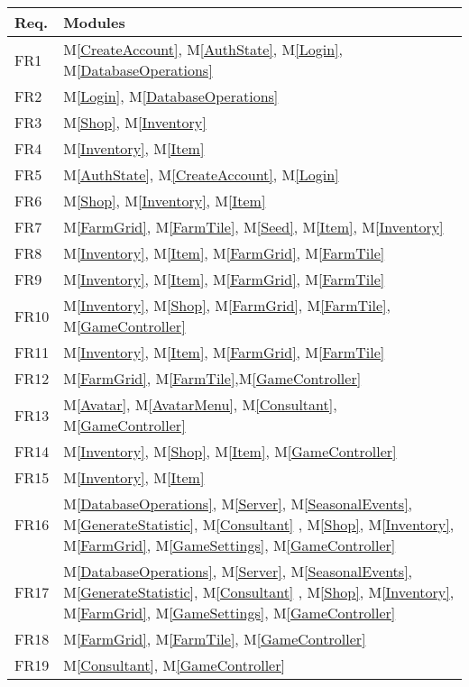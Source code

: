 \documentclass[12pt, titlepage]{article}
\newcommand{\mref}[1]{M\ref{#1}}
\begin{document}
\begin{table}[H]
\centering
\begin{tabular}{p{} p{}}
\toprule
\textbf{Req.} & \textbf{Modules}\\
\midrule
FR1 & \mref{CreateAccount}, \mref{AuthState}, \mref{Login}, \mref{DatabaseOperations}\\
FR2 &  \mref{Login}, \mref{DatabaseOperations}\\
FR3 & \mref{Shop}, \mref{Inventory} \\
FR4 & \mref{Inventory}, \mref{Item}\\
FR5 & \mref{AuthState}, \mref{CreateAccount}, \mref{Login}\\
FR6 & \mref{Shop}, \mref{Inventory}, \mref{Item}\\
FR7 & \mref{FarmGrid}, \mref{FarmTile}, \mref{Seed}, \mref{Item}, \mref{Inventory}\\
FR8 &  \mref{Inventory}, \mref{Item}, \mref{FarmGrid}, \mref{FarmTile} \\
FR9 & \mref{Inventory}, \mref{Item}, \mref{FarmGrid}, \mref{FarmTile}\\
FR10 & \mref{Inventory}, \mref{Shop}, \mref{FarmGrid}, \mref{FarmTile}, \mref{GameController}\\
FR11 & \mref{Inventory}, \mref{Item}, \mref{FarmGrid}, \mref{FarmTile}\\
FR12 & \mref{FarmGrid}, \mref{FarmTile},\mref{GameController}\\
FR13 & \mref{Avatar}, \mref{AvatarMenu}, \mref{Consultant}, \mref{GameController}\\
FR14 & \mref{Inventory}, \mref{Shop}, \mref{Item}, \mref{GameController}\\
FR15 & \mref{Inventory}, \mref{Item}\\
FR16 &  \mref{DatabaseOperations}, \mref{Server}, \mref{SeasonalEvents}, \mref{GenerateStatistic}, \mref{Consultant} , \mref{Shop}, \mref{Inventory}, \mref{FarmGrid}, \mref{GameSettings}, \mref{GameController}\\
FR17 & \mref{DatabaseOperations}, \mref{Server}, \mref{SeasonalEvents}, \mref{GenerateStatistic}, \mref{Consultant} , \mref{Shop}, \mref{Inventory}, \mref{FarmGrid}, \mref{GameSettings}, \mref{GameController}\\
FR18 & \mref{FarmGrid}, \mref{FarmTile}, \mref{GameController}\\
FR19 & \mref{Consultant}, \mref{GameController}\\

\end{tabular}
\end{table}
\end{document}
